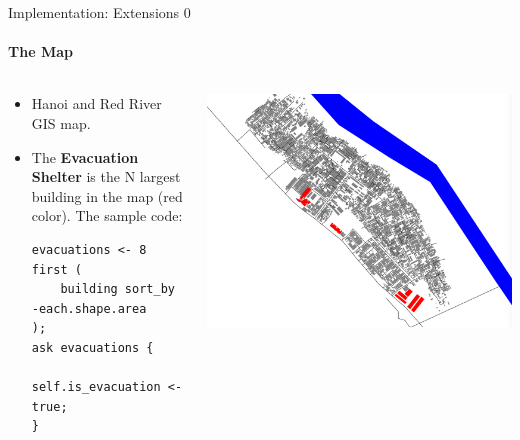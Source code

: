\documentclass{beamer}
\begin{document}
\begin{frame}[fragile]{Implementation: Extensions 0}
\framesubtitle{The Map}

\begin{columns}
\begin{column}{0.5\textwidth}
\begin{itemize}
    \item Hanoi and Red River GIS map.
    \item The \textbf{Evacuation Shelter} is the N largest building in the map (red color). The sample code:

\begin{lstlisting}[style=GAML]
evacuations <- 8 first (
    building sort_by -each.shape.area
);
ask evacuations {
    self.is_evacuation <- true;
}
\end{lstlisting}

\end{itemize}

\end{column}

\begin{column}{0.5\textwidth}
    \includegraphics[width=\textwidth]{img/GIS-map-hanoi-red-river.png}
\end{column}
\end{columns}

\end{frame}
\end{document}
